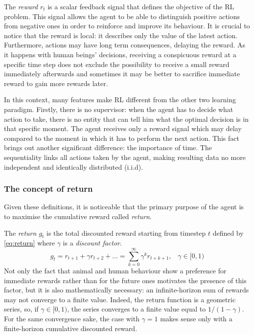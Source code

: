 The \textit{reward} $r_t$ is a scalar feedback signal that defines the objective of the RL problem. This signal allows the agent to be able to distinguish positive actions from negative ones in order to reinforce and improve its behaviour. It is crucial to notice that the reward is local: it describes only the value of the latest action. Furthermore, actions may have long term consequences, delaying the reward. As it happens with human beings' decisions, receiving a conspicuous reward at a specific time step does not exclude the possibility to receive a small reward immediately afterwards and sometimes it may be better to sacrifice immediate reward to gain more rewards later.

In this context, many features make RL different from the other two learning paradigm.
Firstly, there is no supervisor: when the agent has to decide what action to take, there is no entity that can tell him what the optimal decision is in that specific moment. The agent receives only a reward signal which may delay compared to the moment in which it has to perform the next action. 
This fact brings out another significant difference: the importance of time. The sequentiality links all actions taken by the agent, making resulting data no more independent and identically distributed (i.i.d).

\subsubsection{The concept of return}

Given these definitions, it is noticeable that the primary purpose of the agent is to maximise the cumulative reward called \textit{return}.


The \textit{return $g_t$} is the total discounted reward starting from timestep $t$ defined by \vref{eq:return} where $\gamma$ is a \textit{discount factor}.
\begin{equation} \label{eq:return} 
	g_t = r_{t+1} + \gamma r_{t+2} + \dots = \sum_{k=0}^{\infty} \gamma^k r_{t+k+1}, \;\;\;\gamma \in [0,1)
\end{equation}
 Not only the fact that animal and human behaviour show a preference for immediate rewards rather than for the future ones motivates the presence of this factor, but it is also mathematically necessary: an infinite-horizon sum of rewards may not converge to a finite value. Indeed, the return function is a geometric series, so, if $\gamma \in [0,1)$, the series converges to a finite value equal to $1/(1-\gamma)$. For the same convergence sake, the case with $\gamma = 1$ makes sense only with a finite-horizon cumulative discounted reward.

